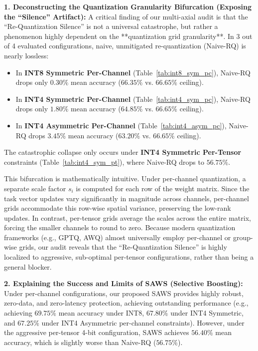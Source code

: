 \textbf{1. Deconstructing the Quantization Granularity Bifurcation (Exposing the ``Silence'' Artifact):}
A critical finding of our multi-axial audit is that the ``Re-Quantization Silence'' is not a universal catastrophe, but rather a phenomenon highly dependent on the **quantization grid granularity**. 
In 3 out of 4 evaluated configurations, naive, unmitigated re-quantization (Naive-RQ) is nearly lossless:
\begin{itemize}
  \item In \textbf{INT8 Symmetric Per-Channel} (Table~\ref{tab:int8_sym_pc}), Naive-RQ drops only $0.30\%$ mean accuracy ($66.35\%$ vs. $66.65\%$ ceiling).
  \item In \textbf{INT4 Symmetric Per-Channel} (Table~\ref{tab:int4_sym_pc}), Naive-RQ drops only $1.80\%$ mean accuracy ($64.85\%$ vs. $66.65\%$ ceiling).
  \item In \textbf{INT4 Asymmetric Per-Channel} (Table~\ref{tab:int4_asym_pc}), Naive-RQ drops $3.45\%$ mean accuracy ($63.20\%$ vs. $66.65\%$ ceiling).
\end{itemize}
The catastrophic collapse only occurs under \textbf{INT4 Symmetric Per-Tensor} constraints (Table~\ref{tab:int4_sym_pt}), where Naive-RQ drops to $56.75\%$. 

This bifurcation is mathematically intuitive. Under per-channel quantization, a separate scale factor $s_i$ is computed for each row of the weight matrix. Since the task vector updates vary significantly in magnitude across channels, per-channel grids accommodate this row-wise spatial variance, preserving the low-rank updates. In contrast, per-tensor grids average the scales across the entire matrix, forcing the smaller channels to round to zero. Because modern quantization frameworks (e.g., GPTQ, AWQ) almost universally employ per-channel or group-wise grids, our audit reveals that the ``Re-Quantization Silence'' is highly localized to aggressive, sub-optimal per-tensor configurations, rather than being a general blocker.

\textbf{2. Explaining the Success and Limits of SAWS (Selective Boosting):}
Under per-channel configurations, our proposed SAWS provides highly robust, zero-data, and zero-latency protection, achieving outstanding performance (e.g., achieving $69.75\%$ mean accuracy under INT8, $67.80\%$ under INT4 Symmetric, and $67.25\%$ under INT4 Asymmetric per-channel constraints). However, under the aggressive per-tensor 4-bit configuration, SAWS achieves $56.40\%$ mean accuracy, which is slightly worse than Naive-RQ ($56.75\%$). 

